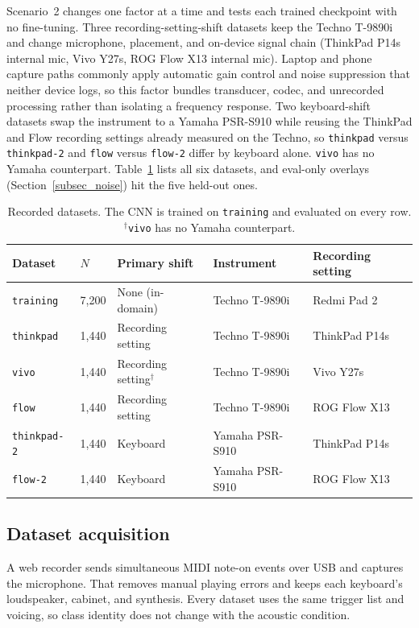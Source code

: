 \documentclass[pdflatex,sn-mathphys-num,iicol]{sn-jnl}
\begin{document}
Scenario~2 changes one factor at a time and tests each trained checkpoint with no fine-tuning. Three recording-setting-shift datasets keep the Techno T-9890i and change microphone, placement, and on-device signal chain (ThinkPad P14s internal mic, Vivo Y27s, ROG Flow X13 internal mic). Laptop and phone capture paths commonly apply automatic gain control and noise suppression that neither device logs, so this factor bundles transducer, codec, and unrecorded processing rather than isolating a frequency response. Two keyboard-shift datasets swap the instrument to a Yamaha PSR-S910 while reusing the ThinkPad and Flow recording settings already measured on the Techno, so \texttt{thinkpad} versus \texttt{thinkpad-2} and \texttt{flow} versus \texttt{flow-2} differ by keyboard alone. \texttt{vivo} has no Yamaha counterpart. Table~\ref{tab_datasets} lists all six datasets, and eval-only overlays (Section~\ref{subsec_noise}) hit the five held-out ones.

\begin{table}[t]
\caption{Recorded datasets. The CNN is trained on \texttt{training} and evaluated on every row. $^\dagger$\texttt{vivo} has no Yamaha counterpart.}\label{tab_datasets}
\begin{tabular*}{\textwidth}{@{\extracolsep{\fill}}lllll@{}}
\toprule
Dataset & $N$ & Primary shift & Instrument & Recording setting \\
\midrule
\texttt{training} & 7{,}200 & None (in-domain) & Techno T-9890i & Redmi Pad 2 \\
\texttt{thinkpad} & 1{,}440 & Recording setting & Techno T-9890i & ThinkPad P14s \\
\texttt{vivo} & 1{,}440 & Recording setting$^\dagger$ & Techno T-9890i & Vivo Y27s \\
\texttt{flow} & 1{,}440 & Recording setting & Techno T-9890i & ROG Flow X13 \\
\texttt{thinkpad-2} & 1{,}440 & Keyboard & Yamaha PSR-S910 & ThinkPad P14s \\
\texttt{flow-2} & 1{,}440 & Keyboard & Yamaha PSR-S910 & ROG Flow X13 \\
\bottomrule
\end{tabular*}
\end{table}

\subsection{Dataset acquisition}\label{subsec_acquisition}

A web recorder sends simultaneous MIDI note-on events over USB and captures the microphone. That removes manual playing errors and keeps each keyboard's loudspeaker, cabinet, and synthesis. Every dataset uses the same trigger list and voicing, so class identity does not change with the acoustic condition.
\end{document}
